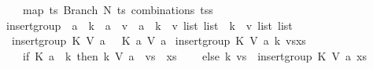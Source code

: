 \begin{isabellebody}
\ \ \ \ map\ {\isacharparenleft}{\kern0pt}{\isasymlambda}ts{\isachardot}{\kern0pt}\ Branch\ N\ ts{\isacharparenright}{\kern0pt}\ {\isacharparenleft}{\kern0pt}combinations\ tss{\isacharparenright}{\kern0pt}\isanewline
\ \ {\isacharparenright}{\kern0pt}{\isachardoublequoteclose}%
\isadelimdocument
%
\endisadelimdocument
%
\isatagdocument
%
\isamarkuptrue%
%
\endisatagdocument
{\isafolddocument}%
%
\isadelimdocument
%
\endisadelimdocument
{}\isamarkupfalse%
\ insert{\isacharunderscore}{\kern0pt}group\ {\isacharcolon}{\kern0pt}{\isacharcolon}{\kern0pt}\ {\isachardoublequoteopen}{\isacharparenleft}{\kern0pt}{\isacharprime}{\kern0pt}a\ {\isasymRightarrow}\ {\isacharprime}{\kern0pt}k{\isacharparenright}{\kern0pt}\ {\isasymRightarrow}\ {\isacharparenleft}{\kern0pt}{\isacharprime}{\kern0pt}a\ {\isasymRightarrow}\ {\isacharprime}{\kern0pt}v{\isacharparenright}{\kern0pt}\ {\isasymRightarrow}\ {\isacharprime}{\kern0pt}a\ {\isasymRightarrow}\ {\isacharparenleft}{\kern0pt}{\isacharprime}{\kern0pt}k\ {\isasymtimes}\ {\isacharprime}{\kern0pt}v\ list{\isacharparenright}{\kern0pt}\ list\ {\isasymRightarrow}\ {\isacharparenleft}{\kern0pt}{\isacharprime}{\kern0pt}k\ {\isasymtimes}\ {\isacharprime}{\kern0pt}v\ list{\isacharparenright}{\kern0pt}\ list{\isachardoublequoteclose}\ \isanewline
\ \ {\isachardoublequoteopen}insert{\isacharunderscore}{\kern0pt}group\ K\ V\ a\ {\isacharbrackleft}{\kern0pt}{\isacharbrackright}{\kern0pt}\ {\isacharequal}{\kern0pt}\ {\isacharbrackleft}{\kern0pt}{\isacharparenleft}{\kern0pt}K\ a{\isacharcomma}{\kern0pt}\ {\isacharbrackleft}{\kern0pt}V\ a{\isacharbrackright}{\kern0pt}{\isacharparenright}{\kern0pt}{\isacharbrackright}{\kern0pt}{\isachardoublequoteclose}\isanewline
{\isacharbar}{\kern0pt}\ {\isachardoublequoteopen}insert{\isacharunderscore}{\kern0pt}group\ K\ V\ a\ {\isacharparenleft}{\kern0pt}{\isacharparenleft}{\kern0pt}k{\isacharcomma}{\kern0pt}\ vs{\isacharparenright}{\kern0pt}{\isacharhash}{\kern0pt}xs{\isacharparenright}{\kern0pt}\ {\isacharequal}{\kern0pt}\ {\isacharparenleft}{\kern0pt}\isanewline
\ \ \ \ if\ K\ a\ {\isacharequal}{\kern0pt}\ k\ then\ {\isacharparenleft}{\kern0pt}k{\isacharcomma}{\kern0pt}\ V\ a\ {\isacharhash}{\kern0pt}\ vs{\isacharparenright}{\kern0pt}\ {\isacharhash}{\kern0pt}\ xs\isanewline
\ \ \ \ else\ {\isacharparenleft}{\kern0pt}k{\isacharcomma}{\kern0pt}\ vs{\isacharparenright}{\kern0pt}\ {\isacharhash}{\kern0pt}\ insert{\isacharunderscore}{\kern0pt}group\ K\ V\ a\ xs\ \ \isanewline
\ \ {\isacharparenright}{\kern0pt}{\isachardoublequoteclose}\isanewline

\end{isabellebody}
